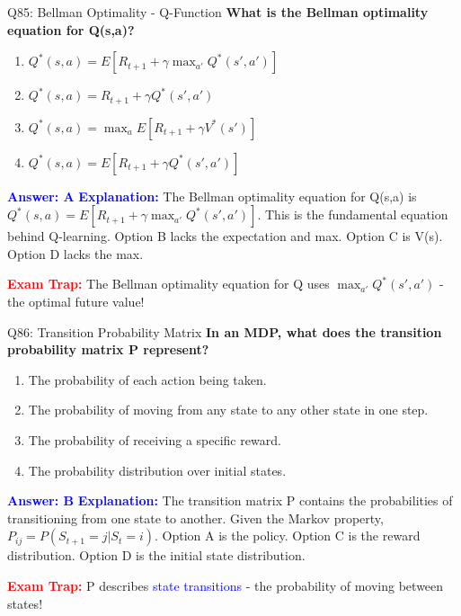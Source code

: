 \documentclass[8pt]{beamer}
\begin{document}
	\begin{frame}{Q85: Bellman Optimality - Q-Function}
		\fontsize{6.5}{7.5}\selectfont
		\textbf{What is the Bellman optimality equation for Q(s,a)?}
		
		\begin{enumerate}
			\item $Q^*(s,a) = E[R_{t+1} + \gamma \max_{a'} Q^*(s',a')]$
			\item $Q^*(s,a) = R_{t+1} + \gamma Q^*(s',a')$
			\item $Q^*(s,a) = \max_a E[R_{t+1} + \gamma V^*(s')]$
			\item $Q^*(s,a) = E[R_{t+1} + \gamma Q^*(s',a')]$
		\end{enumerate}
		
		\vspace{0.1cm}
		\textcolor{blue}{\textbf{Answer: A}}
		\vspace{0.1cm}
		\textcolor{blue}{\textbf{Explanation:}} The Bellman optimality equation for Q(s,a) is $Q^*(s,a) = E[R_{t+1} + \gamma \max_{a'} Q^*(s',a')]$. This is the fundamental equation behind Q-learning. Option B lacks the expectation and max. Option C is V(s). Option D lacks the max.
		
		\textcolor{red}{\textbf{Exam Trap:}} The Bellman optimality equation for Q uses $\max_{a'} Q^*(s',a')$ - the optimal future value!
	\end{frame}
	
	\begin{frame}{Q86: Transition Probability Matrix}
		\fontsize{6.5}{7.5}\selectfont
		\textbf{In an MDP, what does the transition probability matrix P represent?}
		
		\begin{enumerate}
			\item The probability of each action being taken.
			\item The probability of moving from any state to any other state in one step.
			\item The probability of receiving a specific reward.
			\item The probability distribution over initial states.
		\end{enumerate}
		
		\vspace{0.1cm}
		\textcolor{blue}{\textbf{Answer: B}}
		\vspace{0.1cm}
		\textcolor{blue}{\textbf{Explanation:}} The transition matrix P contains the probabilities of transitioning from one state to another. Given the Markov property, $P_{ij} = P(S_{t+1} = j | S_t = i)$. Option A is the policy. Option C is the reward distribution. Option D is the initial state distribution.
		
		\textcolor{red}{\textbf{Exam Trap:}} P describes \textcolor{blue}{state transitions} - the probability of moving between states!
	\end{frame}
	
\end{document}
